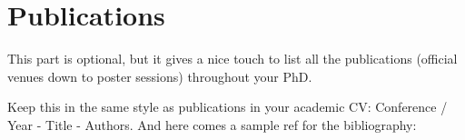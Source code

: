 \chapter*{\rm\bfseries Publications}
\label{ch:publications}

This part is optional, but it gives a nice touch to list all the publications (official venues down to poster sessions) throughout your PhD.

Keep this in the same style as publications in your academic CV: 
Conference / Year - Title - Authors. And here comes a sample ref for the bibliography: \cite{considine2023pragmatic}

